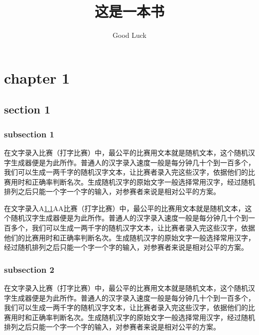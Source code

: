\documentclass[12pt,hyperref,UTF8]{ctexbook}
\title{这是一本书}                              %
\author{Good Luck}                              %
\begin{document}
\frontmatter
\pagestyle{empty}                 %
\maketitle                        %

\cleardoublepage
\pagestyle{headings}              %
\tableofcontents                  %

\mainmatter
\cleardoublepage
%
%
\chapter{chapter 1}
\section{section 1}
\label{testsection}

\subsection{subsection 1}

在文字录入比赛（打字比赛）中，最公平的比赛用文本就是随机文本，这个随机汉字生成器便是为此所作。普通人的汉字录入速度一般是每分钟几十个到一百多个，我们可以生成一两千字的随机汉字文本，让比赛者录入完这些汉字，依据他们的比赛用时和正确率判断名次。生成随机汉字的原始文字一般选择常用汉字，经过随机排列之后只能一个字一个字的输入，对参赛者来说是相对公平的方案。

在文字录入A\ref{testsection}A\pageref{testsection}A比赛（打字比赛）中，最公平的比赛用文本就是随机文本，这个随机汉字生成器便是为此所作。普通人的汉字录入速度一般是每分钟几十个到一百多个，我们可以生成一两千字的随机汉字文本，让比赛者录入完这些汉字，依据他们的比赛用时和正确率判断名次。生成随机汉字的原始文字一般选择常用汉字，经过随机排列之后只能一个字一个字的输入，对参赛者来说是相对公平的方案。

\subsection{subsection 2}

在文字录入比赛（打字比赛）中，最公平的比赛用文本就是随机文本，这个随机汉字生成器便是为此所作。普通人的汉字录入速度一般是每分钟几十个到一百多个，我们可以生成一两千字的随机汉字文本，让比赛者录入完这些汉字，依据他们的比赛用时和正确率判断名次。生成随机汉字的原始文字一般选择常用汉字，经过随机排列之后只能一个字一个字的输入，对参赛者来说是相对公平的方案。
\end{document}
